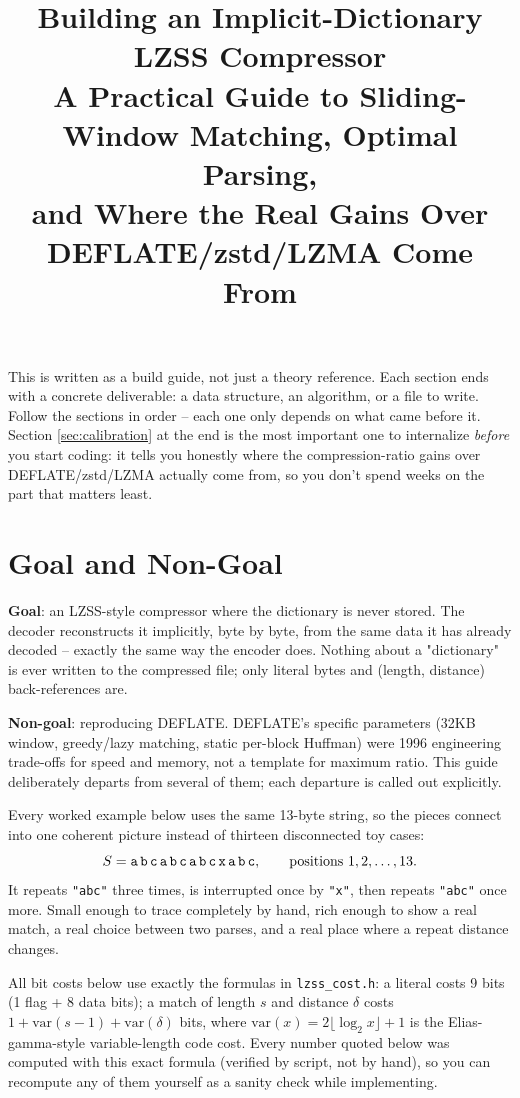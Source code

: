 \documentclass[11pt]{article}
\title{Building an Implicit-Dictionary LZSS Compressor \\
\large A Practical Guide to Sliding-Window Matching, Optimal Parsing, \\
and Where the Real Gains Over DEFLATE/zstd/LZMA Come From}
\author{}
\date{}
\begin{document}
\maketitle

\begin{tcolorbox}[colback=yellow!5!white,colframe=yellow!75!black,title=How to use this document]
This is written as a build guide, not just a theory reference. Each section ends with a
concrete deliverable: a data structure, an algorithm, or a file to write. Follow the
sections in order -- each one only depends on what came before it. Section
\ref{sec:calibration} at the end is the most important one to internalize \emph{before}
you start coding: it tells you honestly where the compression-ratio gains over
DEFLATE/zstd/LZMA actually come from, so you don't spend weeks on the part that matters
least.
\end{tcolorbox}

\tableofcontents

\section{Goal and Non-Goal}

\textbf{Goal}: an LZSS-style compressor where the dictionary is never stored. The decoder
reconstructs it implicitly, byte by byte, from the same data it has already decoded --
exactly the same way the encoder does. Nothing about a "dictionary" is ever written to
the compressed file; only literal bytes and (length, distance) back-references are.

\textbf{Non-goal}: reproducing DEFLATE. DEFLATE's specific parameters (32KB window,
greedy/lazy matching, static per-block Huffman) were 1996 engineering trade-offs for
speed and memory, not a template for maximum ratio. This guide deliberately departs from
several of them; each departure is called out explicitly.

\begin{tcolorbox}[colback=green!5!white,colframe=green!45!black,title=Running example used throughout this document]
Every worked example below uses the same 13-byte string, so the pieces connect into one
coherent picture instead of thirteen disconnected toy cases:
\[
  S = \texttt{a\,b\,c\,a\,b\,c\,a\,b\,c\,x\,a\,b\,c}, \qquad
  \text{positions } 1,2,\dots,13.
\]
It repeats \texttt{"abc"} three times, is interrupted once by \texttt{"x"}, then repeats
\texttt{"abc"} once more. Small enough to trace completely by hand, rich enough to show
a real match, a real choice between two parses, and a real place where a repeat
distance changes.

All bit costs below use exactly the formulas in \texttt{lzss\_cost.h}: a literal costs 9
bits (1 flag + 8 data bits); a match of length $s$ and distance $\delta$ costs
$1 + \text{var}(s-1) + \text{var}(\delta)$ bits, where $\text{var}(x) = 2\lfloor \log_2
x\rfloor + 1$ is the Elias-gamma-style variable-length code cost. Every number quoted
below was computed with this exact formula (verified by script, not by hand), so you can
recompute any of them yourself as a sanity check while implementing.
\end{tcolorbox}
\end{document}
